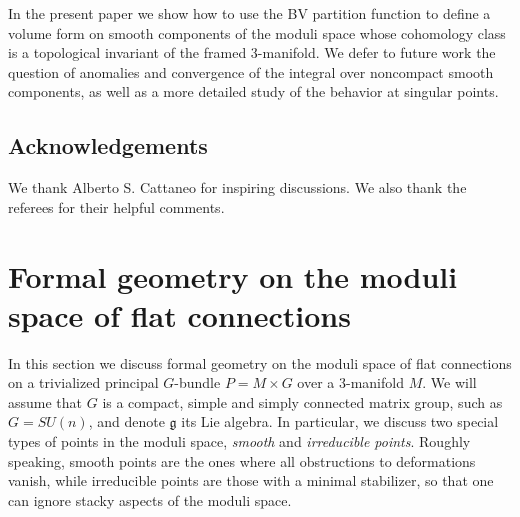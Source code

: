 \documentclass[11pt,a4paper]{amsart}
\theoremstyle{plain} %
\theoremstyle{definition}
\theoremstyle{remark}
\newcommand{\g}{\mathfrak{g}}
\begin{document}
In the present paper we show how to use the BV partition function to define a volume form on smooth components of the moduli space  whose cohomology class is a topological invariant of the framed 3-manifold. We defer to future work the question of anomalies and convergence of the integral over noncompact smooth components, as well as a more detailed study of the behavior at singular points. 

\subsection{Acknowledgements}
We thank Alberto S. Cattaneo for inspiring discussions. We also thank the referees for their helpful comments.

\section{Formal geometry on the moduli space of flat connections}\label{sec: formal geometry}
In this section we discuss %
formal geometry on the moduli space of flat connections on a trivialized principal $G$-bundle $P = M \times G$ over a 3-manifold $M$. We will assume that $G$ is a compact, simple and simply connected matrix group, such as $G = SU(n)$, and denote $\g$ its Lie algebra.  %
In particular, we discuss two special types of points in the moduli space, \emph{smooth} and \emph{irreducible points}. Roughly speaking, smooth points are the ones where all obstructions to deformations vanish, while irreducible points are those with a minimal stabilizer, so that one can ignore stacky aspects of the moduli space.
\end{document}
